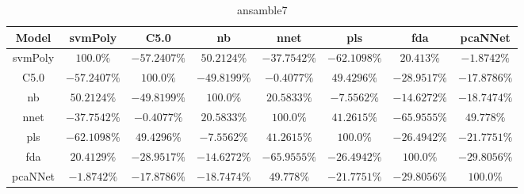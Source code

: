 \begin{table}[!ht]
	\centering
	\begin{tabular}{|c|c|c|c|c|c|c|c|}
		\hline
		Model & svmPoly & C5.0 & nb & nnet & pls & fda & pcaNNet \\ \hline
		svmPoly & $100.0\%$ & $-57.2407\%$ & $50.2124\%$ & $-37.7542\%$ & $-62.1098\%$ & $20.413\%$ & $-1.8742\%$ \\ \hline
		C5.0 & $-57.2407\%$ & $100.0\%$ & $-49.8199\%$ & $-0.4077\%$ & $49.4296\%$ & $-28.9517\%$ & $-17.8786\%$ \\ \hline
		nb & $50.2124\%$ & $-49.8199\%$ & $100.0\%$ & $20.5833\%$ & $-7.5562\%$ & $-14.6272\%$ & $-18.7474\%$ \\ \hline
		nnet & $-37.7542\%$ & $-0.4077\%$ & $20.5833\%$ & $100.0\%$ & $41.2615\%$ & $-65.9555\%$ & $49.778\%$ \\ \hline
		pls & $-62.1098\%$ & $49.4296\%$ & $-7.5562\%$ & $41.2615\%$ & $100.0\%$ & $-26.4942\%$ & $-21.7751\%$ \\ \hline
		fda & $20.4129\%$ & $-28.9517\%$ & $-14.6272\%$ & $-65.9555\%$ & $-26.4942\%$ & $100.0\%$ & $-29.8056\%$ \\ \hline
		pcaNNet & $-1.8742\%$ & $-17.8786\%$ & $-18.7474\%$ & $49.778\%$ & $-21.7751\%$ & $-29.8056\%$ & $100.0\%$ \\ \hline
	\end{tabular}
	\caption{ansamble7}
	\label{tab:ansamble7}
\end{table}
